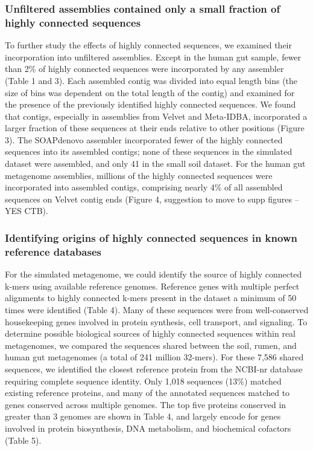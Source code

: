 \documentclass[10pt]{article}
\begin{document}
\subsubsection*{Unfiltered assemblies contained only a small fraction of highly connected sequences}
To further study the effects of highly connected sequences, we
examined their incorporation into unfiltered assemblies.  Except in
the human gut sample, fewer than 2\% of highly connected sequences
were incorporated by any assembler (Table 1 and 3).  Each assembled
contig was divided into equal length bins (the size of bins was
dependent on the total length of the contig) and examined for the
presence of the previously identified highly connected sequences.  We
found that contigs, especially in assemblies from Velvet and
Meta-IDBA, incorporated a larger fraction of these sequences at their
ends relative to other positions (Figure 3).  The SOAPdenovo
assembler incorporated fewer of the highly connected sequences into
its assembled contigs; none of these sequences in the simulated
dataset were assembled, and only 41 in the small soil dataset.  For
the human gut metagenome assemblies, millions of the highly connected
sequences were incorporated into assembled contigs, comprising nearly
4\% of all assembled sequences on Velvet contig ends (Figure 4,
suggestion to move to supp figures -- YES CTB).

\subsubsection*{Identifying origins of highly connected sequences in known reference databases}

For the simulated metagenome, we could identify the source of highly
connected k-mers using available reference genomes. Reference genes
with multiple perfect alignments to highly connected k-mers present in
the dataset a minimum of 50 times were identified (Table 4).  Many of
these sequences were from well-conserved housekeeping genes involved
in protein synthesis, cell transport, and signaling.  To determine
possible biological sources of highly connected sequences within real
metagenomes, we compared the sequences shared between the soil, rumen,
and human gut metagenomes (a total of 241 million 32-mers).  For these 7,586 shared sequences, we identified the closest reference
protein from the NCBI-nr database requiring complete sequence
identity.  Only 1,018 sequences (13\%) matched existing reference
proteins, and many of the annotated sequences matched to
genes conserved across multiple genomes.  The top five
proteins conserved in greater than 3 genomes are shown in Table 4, and
largely encode for genes involved in protein biosynthesis, DNA
metabolism, and biochemical cofactors (Table 5).
\end{document}
